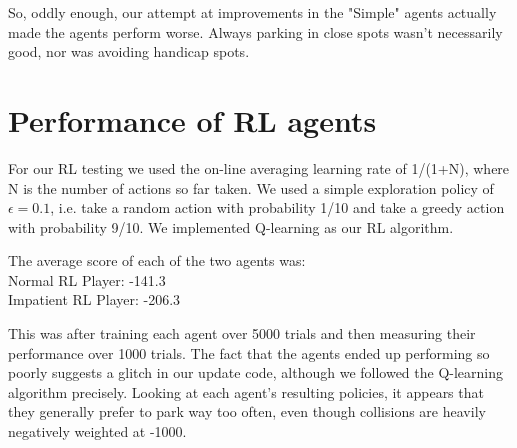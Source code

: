 \documentclass{article}
\begin{document}
\vspace{1em}

So, oddly enough, our attempt at improvements in the "Simple" agents actually
made the agents perform worse. Always parking in close spots wasn't necessarily
good, nor was avoiding handicap spots.

\section{Performance of RL agents}

For our RL testing we used the on-line averaging learning rate of 1/(1+N),
where N is the number of actions so far taken. We used a simple exploration
policy of $\epsilon = 0.1$, i.e. take a random action with probability 1/10 and
take a greedy action with probability 9/10. We implemented Q-learning as our
RL algorithm. 

\vspace{1em}

The average score of each of the two agents was:\\
Normal RL Player: -141.3\\
Impatient RL Player: -206.3\\

\vspace{1em}

This was after training each agent over 5000 trials and then measuring their
performance over 1000 trials. The fact that the agents ended up performing so
poorly suggests a glitch in our update code, although we followed the Q-learning
algorithm precisely. Looking at each agent's resulting policies, it appears
that they generally prefer to park way too often, even though collisions are
heavily negatively weighted at -1000.
\end{document}
